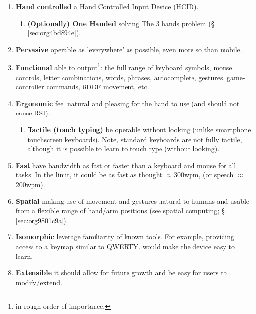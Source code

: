 \documentclass[logo,bsc,singlespacing,parskip]{infthesis}
\begin{document}
\begin{enumerate}
\item \textbf{Hand controlled} a Hand Controlled Input Device (\hyperref[org0c83164]{HCID}).

\begin{enumerate}
\item \textbf{(Optionally) One Handed} solving \hyperref[sec:org4bd894e]{The 3 hands problem} (§ \ref{sec:org4bd894e}).
\end{enumerate}

\item \textbf{Pervasive} operable as 'everywhere' as possible, even more so than mobile.

\item \textbf{Functional} able to output\footnote{in rough order of importance.}: the full range of keyboard symbols, mouse controls, letter combinations, words, phrases, autocomplete, gestures, game-controller commands, 6DOF movement, etc.

\item \textbf{Ergonomic} feel natural and pleasing for the hand to use (and should not cause \hyperref[org77f0234]{RSI}).

\begin{enumerate}
\item \textbf{Tactile (touch typing)} be operable without looking (unlike smartphone touchscreen keyboards). Note, standard keyboards are not fully tactile, although it is possible to learn to touch type (without looking).
\end{enumerate}

\item \textbf{Fast} have bandwidth as fast or faster than a keyboard and mouse for all tasks. In the limit, it could be as fast as thought \(\approx\)300wpm, (or speech \(\approx\)200wpm).

\item \textbf{Spatial} making use of movement and gestures natural to humans and usable from a flexible range of hand/arm positions (see \hyperref[sec:org9801c9a]{spatial computing}; § \ref{sec:org9801c9a}).

\item \textbf{Isomorphic} leverage familiarity of known tools. For example, providing access to a keymap similar to QWERTY. would make the device easy to learn.

\item \textbf{Extensible} it should allow for future growth and be easy for users to modify/extend.
\end{enumerate}
\end{document}
